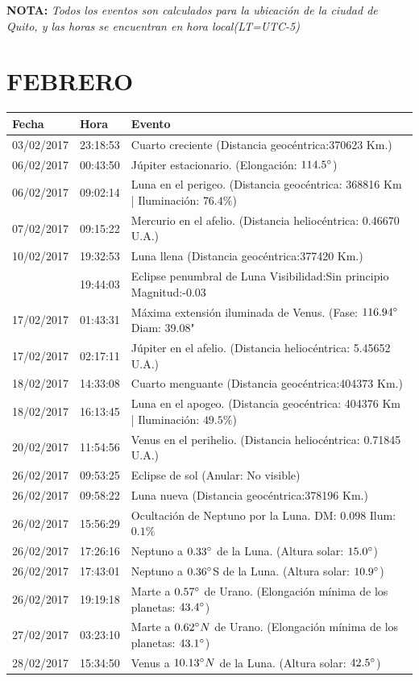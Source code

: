 \documentclass[12pt,a4paper,oneside]{article}
\begin{document}
\vspace{1cm}
\textbf{NOTA:  }\textit{Todos los eventos son calculados para la ubicaci\'on de la ciudad de Quito, y las horas se encuentran en hora local(LT=UTC-5)}
\vspace{0.7cm}
\newpage
\section{FEBRERO}
\begin{center}
\begin{tabular}{ |l| l| l| }
\hline
 \textbf{Fecha} & \textbf{Hora} & \textbf{Evento}\\
 \hline
 03/02/2017&23:18:53 &Cuarto creciente (Distancia geocéntrica:370623 Km.)	\\
06/02/2017&00:43:50 &	Júpiter estacionario. (Elongación: $114.5 \degree $)	\\
06/02/2017& 09:02:14&	Luna en el perigeo. (Distancia geocéntrica: 368816 Km | Iluminación: $76.4\%$)\\
07/02/2017&09:15:22&Mercurio en el afelio. (Distancia heliocéntrica: 0.46670 U.A.)	\\
10/02/2017&19:32:53 &	Luna llena (Distancia geocéntrica:377420 Km.)	\\
\colorbox{blue}{10/02/2017&19:44:03 &	Eclipse penumbral de Luna Visibilidad:Sin principio Magnitud:-0.03}\\
17/02/2017&01:43:31 &	Máxima extensión iluminada de Venus. (Fase: $116.94 \degree $ Diam: 39.08" \\
17/02/2017&02:17:11 &	Júpiter en el afelio. (Distancia heliocéntrica: 5.45652 U.A.)\\
18/02/2017&14:33:08 &	Cuarto menguante (Distancia geocéntrica:404373 Km.)\\
18/02/2017& 16:13:45 &	Luna en el apogeo. (Distancia geocéntrica: 404376 Km | Iluminación: $49.5\%$)	\\
20/02/2017&11:54:56 &	Venus en el perihelio. (Distancia heliocéntrica: 0.71845 U.A.)	\\
26/02/2017&09:53:25 &	Eclipse de sol   (Anular: No visible) \\
26/02/2017&09:58:22 &	Luna nueva (Distancia geocéntrica:378196 Km.)	\\
26/02/2017&15:56:29 &	Ocultación de Neptuno por la Luna. DM: 0.098 Ilum: $0.1\%$ \\
26/02/2017&17:26:16 &	Neptuno a $0.33 \degree $ de la Luna. (Altura solar: $15.0 \degree $)	\\
26/02/2017&17:43:01 &	Neptuno a $0.36 \degree $S de la Luna. (Altura solar: $10.9 \degree $)	\\
26/02/2017&19:19:18 &	Marte a $0.57 \degree $ de Urano. (Elongación mínima de los planetas: $43.4 \degree $)	\\
27/02/2017&03:23:10 &	Marte a $0.62 \degree N$ de Urano. (Elongación mínima de los planetas: $43.1 \degree $)\\
28/02/2017&15:34:50 &	Venus a $10.13 \degree N$ de la Luna. (Altura solar: $42.5 \degree $)	\\
\hline
\end{tabular}
\end{center}
\end{document}
